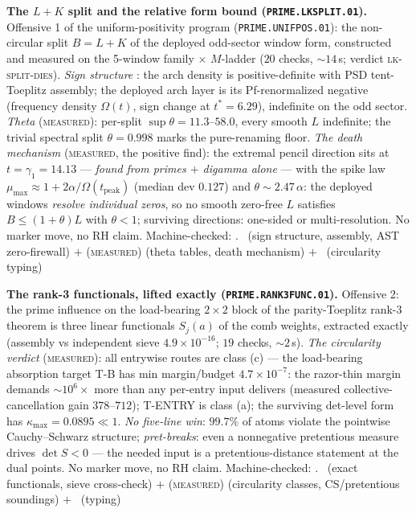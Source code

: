 \documentclass[11pt,a4paper]{article}
\theoremstyle{definition}
\begin{document}
\par\smallskip\noindent\textbf{The $L+K$ split and the relative form
bound (\texttt{PRIME.LKSPLIT.01}).}
Offensive 1 of the uniform-positivity program
(\texttt{PRIME.UNIFPOS.01}): the non-circular split $B=L+K$ of the
deployed odd-sector window form, constructed and measured on the
5-window family $\times$ $M$-ladder ($20$ checks, ${\sim}14$\,s;
verdict \textsc{lk-split-dies}).  \emph{Sign structure} \mE: the arch
density is positive-definite with PSD tent-Toeplitz assembly; the
deployed arch layer is its Pf-renormalized negative (frequency
density $\Omega(t)$, sign change at $t^*=6.29$), indefinite on the
odd sector.  \emph{Theta} (\textsc{measured}): per-split
$\sup\theta=11.3$--$58.0$, every smooth $L$ indefinite; the trivial
spectral split $\theta=0.998$ marks the pure-renaming floor.
\emph{The death mechanism} (\textsc{measured}, the positive find):
the extremal pencil direction sits at $t=\gamma_1=14.13$ ---
\emph{found from primes $+$ digamma alone} --- with the spike law
$\mu_{\max}\approx1+2\alpha/\Omega(t_{\mathrm{peak}})$ (median dev
$0.127$) and $\theta\sim2.47\,\alpha$: the deployed windows
\emph{resolve individual zeros}, so no smooth zero-free $L$
satisfies $B\le(1+\theta)L$ with $\theta<1$; surviving directions:
one-sided or multi-resolution.  No marker move, no RH claim.
Machine-checked: .
\mE\ (sign structure, assembly, AST zero-firewall) $+$
(\textsc{measured}) (theta tables, death mechanism) $+$ \mC\
(circularity typing)
\par\smallskip

\par\smallskip\noindent\textbf{The rank-3 functionals, lifted exactly
(\texttt{PRIME.RANK3FUNC.01}).}
Offensive 2: the prime influence on the load-bearing $2\times2$ block
of the parity-Toeplitz rank-3 theorem is three linear functionals
$S_j(a)$ of the comb weights, extracted exactly (assembly vs
independent sieve $4.9\times10^{-16}$; $19$ checks, ${\sim}2$\,s).
\emph{The circularity verdict} (\textsc{measured}): all entrywise
routes are class (c) --- the load-bearing absorption target T-B has
min margin/budget $4.7\times10^{-7}$: the razor-thin margin demands
$\sim10^{6}\times$ more than any per-entry input delivers (measured
collective-cancellation gain $378$--$712$); T-ENTRY is class (a); the
surviving det-level form has $\kappa_{\max}=0.0895\ll1$.  \emph{No
five-line win}: $99.7\%$ of atoms violate the pointwise
Cauchy--Schwarz structure; \emph{pret-breaks}: even a nonnegative
pretentious measure drives $\det S<0$ --- the needed input is a
pretentious-distance statement at the dual points.  No marker move,
no RH claim.
Machine-checked: .
\mE\ (exact functionals, sieve cross-check) $+$ (\textsc{measured})
(circularity classes, CS/pretentious soundings) $+$ \mC\ (typing)
\par\smallskip
\end{document}
